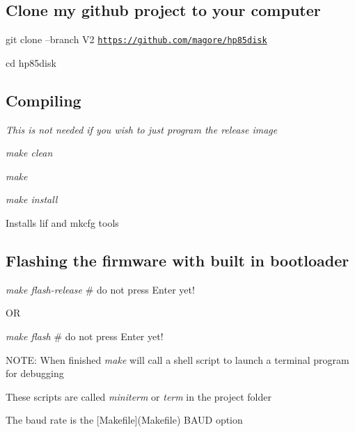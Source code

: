 \subsection*{Clone my github project to your computer}


\begin{DoxyItemize}
\item git clone --branch V2 \href{https://github.com/magore/hp85disk}{\tt https\+://github.\+com/magore/hp85disk}
\item cd hp85disk
\end{DoxyItemize}

\subsection*{Compiling}

{\itshape This is not needed if you wish to just program the release image}
\begin{DoxyItemize}
\item {\itshape make clean}
\item {\itshape make}
\item {\itshape make install}
\begin{DoxyItemize}
\item Installs lif and mkcfg tools
\end{DoxyItemize}
\end{DoxyItemize}

\subsection*{Flashing the firmware with built in bootloader}


\begin{DoxyItemize}
\item {\itshape make flash-\/release} \# do not press Enter yet!
\begin{DoxyItemize}
\item OR
\end{DoxyItemize}
\item {\itshape make flash} \# do not press Enter yet!
\begin{DoxyItemize}
\item N\+O\+TE\+: When finished {\itshape make} will call a shell script to launch a terminal program for debugging
\begin{DoxyItemize}
\item These scripts are called {\itshape miniterm} or {\itshape term} in the project folder
\begin{DoxyItemize}
\item The baud rate is the \mbox{[}Makefile\mbox{]}(Makefile) B\+A\+UD option
\end{DoxyItemize}
\end{DoxyItemize}
\end{DoxyItemize}
\end{DoxyItemize}

